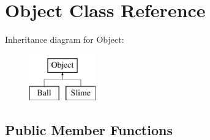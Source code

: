 \hypertarget{classObject}{\section{Object Class Reference}
\label{classObject}
}
Inheritance diagram for Object\-:\begin{figure}[H]
\begin{center}
\leavevmode
\includegraphics[height=2.000000cm]{classObject}
\end{center}
\end{figure}
\subsection*{Public Member Functions}
